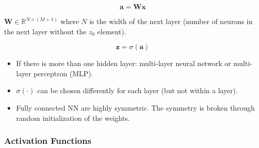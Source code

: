 \begin{equation*}
    \mathbf{a} = \mathbf{W} \mathbf{x}
\end{equation*}

$\mathbf{W} \in \mathbb{R}^{N\times (M+1)}$ where $N$ is the width of the next layer (number of neurons in the next layer without the $z_0$ element).

\newpar{}
\begin{equation*}
    \mathbf{z} = \sigma(\mathbf{a})
\end{equation*}

\begin{itemize}
    \item If there is more than one hidden layer: multi-layer neural network or multi-layer perceptron (MLP).
    \item $\sigma(\cdot)$ can be chosen differently for each layer (but not within a layer).
    \item Fully connected NN are highly symmetric. The symmetry is broken through random initialization of the weights.
\end{itemize}


\subsubsection{Activation Functions}

\renewcommand{\arraystretch}{1.3}
\setlength{\oldtabcolsep}{\tabcolsep}\setlength\tabcolsep{6pt}

